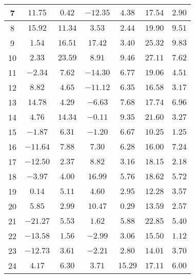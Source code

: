 \begin{table}[H]
\begin{tabular}{|c|c|c|c|c|c|c|}
                        7   & $11.75$   &  $0.42$   &  $-12.35$  &  $4.38$   & $17.54$  &  $2.90$   \\ \hline
                        8   & $15.92$   &  $11.34$  &  $3.53$    &  $2.44$   & $19.90$  &  $9.51$   \\ \hline
                        9   & $1.54$    &  $16.51$  &  $17.42$   &  $3.40$   & $25.32$  &  $9.83$   \\ \hline
                        10  & $2.33$    &  $23.59$  &  $8.91$    &  $9.46$   & $27.11$  &  $7.62$   \\ \hline
                        11  & $-2.34$   &  $7.62$   &  $-14.30$  &  $6.77$   & $19.06$  &  $4.51$   \\ \hline
                        12  & $8.82$    &  $4.65$   &  $-11.12$  &  $6.35$   & $16.58$  &  $3.17$   \\ \hline
                        13  & $14.78$   &  $4.29$   &  $-6.63$   &  $7.68$   & $17.74$  &  $6.96$   \\ \hline
                        14  & $4.76$    &  $14.34$  &  $-0.11$   &  $9.35$   & $21.60$  &  $3.27$   \\ \hline
                        15  & $-1.87$   &  $6.31$   &  $-1.20$   &  $6.67$   & $10.25$  &  $1.25$   \\ \hline
                        16  & $-11.64$  &  $7.88$   &  $7.30$    &  $6.28$   & $16.00$  &  $7.24$   \\ \hline
                        17  & $-12.50$  &  $2.37$   &  $8.82$    &  $3.16$   & $18.15$  &  $2.18$   \\ \hline
                        18  & $-3.97$   &  $4.00$   &  $16.99$   &  $5.76$   & $18.62$  &  $5.72$   \\ \hline
                        19  & $0.14$    &  $5.11$   &  $4.60$    &  $2.95$   & $12.28$  &  $3.57$   \\ \hline
                        20  & $5.85$    &  $2.99$   &  $10.47$   &  $0.29$   & $13.59$  &  $2.57$   \\ \hline
                        21  & $-21.27$  &  $5.53$   &  $1.62$    &  $5.88$   & $22.85$  &  $5.40$   \\ \hline
                        22  & $-13.58$  &  $1.56$   &  $-2.99$   &  $3.06$   & $15.50$  &  $1.12$   \\ \hline
                        23  & $-12.73$  &  $3.61$   &  $-2.21$   &  $2.80$   & $14.01$  &  $3.70$   \\ \hline
                        24  & $4.17$    &  $6.30$   &  $3.71$    &  $15.29$  & $17.11$  &  $6.00$   \\ \hline

\end{tabular}
\end{table}
